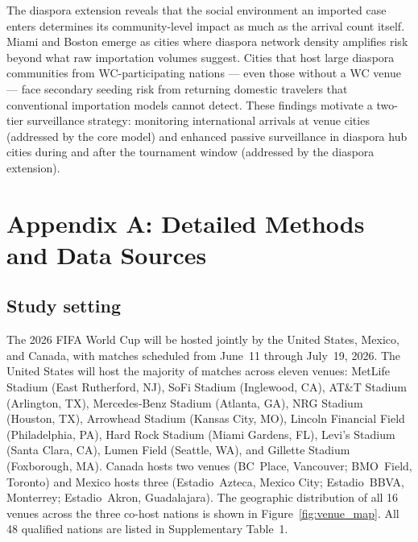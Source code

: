 \documentclass[12pt]{article}
\begin{document}
The diaspora extension reveals that the social environment an imported
case enters determines its community-level impact as much as the
arrival count itself. Miami and Boston emerge as cities where
diaspora network density amplifies risk beyond what raw importation
volumes suggest. Cities that host large diaspora communities from
WC-participating nations --- even those without a WC venue --- face
secondary seeding risk from returning domestic travelers that
conventional importation models cannot detect. These findings
motivate a two-tier surveillance strategy: monitoring international
arrivals at venue cities (addressed by the core model) and enhanced
passive surveillance in diaspora hub cities during and after the
tournament window (addressed by the diaspora extension).




\newpage
\appendix

\section*{Appendix A: Detailed Methods and Data Sources}

\subsection*{Study setting}

The 2026 FIFA World Cup will be hosted jointly by the United States,
Mexico, and Canada, with matches scheduled from June~11 through
July~19, 2026. The United States will host the majority of matches
across eleven venues: MetLife Stadium (East Rutherford, NJ), SoFi
Stadium (Inglewood, CA), AT\&T Stadium (Arlington, TX), Mercedes-Benz
Stadium (Atlanta, GA), NRG Stadium (Houston, TX), Arrowhead Stadium
(Kansas City, MO), Lincoln Financial Field (Philadelphia, PA), Hard
Rock Stadium (Miami Gardens, FL), Levi's Stadium (Santa Clara, CA),
Lumen Field (Seattle, WA), and Gillette Stadium (Foxborough, MA).
Canada hosts two venues (BC~Place, Vancouver; BMO~Field, Toronto) and
Mexico hosts three (Estadio~Azteca, Mexico City; Estadio~BBVA,
Monterrey; Estadio~Akron, Guadalajara). The geographic distribution
of all 16 venues across the three co-host nations is shown in
Figure~\ref{fig:venue_map}.
All 48 qualified nations are listed in Supplementary Table~1.
\end{document}
